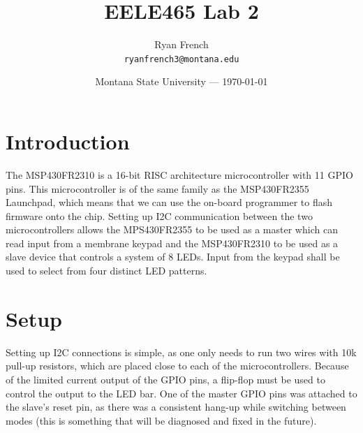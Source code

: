 \documentclass{article}
\title{EELE465 Lab 2} %
\author{Ryan French\\ \texttt{ryanfrench3@montana.edu}} %
\date{Montana State University --- \today} %
\begin{document}
\maketitle %


\section*{Introduction}

The MSP430FR2310 is a 16-bit RISC architecture microcontroller with 11 GPIO pins. This microcontroller is of the same family as the MSP430FR2355 Launchpad, which means that we can use the on-board programmer to flash firmware onto the chip. Setting up I2C communication between the two microcontrollers allows the MPS430FR2355 to be used as a master which can read input from a membrane keypad and the MSP430FR2310 to be used as a slave device that controls a system of 8 LEDs. Input from the keypad shall be used to select from four distinct LED patterns.





\section*{Setup}

Setting up I2C connections is simple, as one only needs to run two wires with 10k pull-up resistors, which are placed close to each of the microcontrollers. Because of the limited current output of the GPIO pins, a flip-flop must be used to control the output to the LED bar.  One of the master GPIO pins was attached to the slave's reset pin, as there was a consistent hang-up while switching between modes (this is something that will be diagnosed and fixed in the future).
\end{document}
